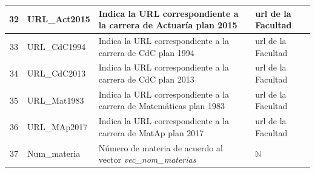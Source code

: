 {\begin{longtable}{|c|l|p{7cm}|p{2.6cm}|}
\hline 
32 & URL\_Act2015 & Indica la URL correspondiente a la carrera de Actuaría plan 2015 & url de la Facultad \\ 
\hline 
33 & URL\_CdC1994 & Indica la URL correspondiente a la carrera de CdC plan 1994 & url de la Facultad \\ 
\hline 
34 & URL\_CdC2013 & Indica la URL correspondiente a la carrera de CdC plan 2013 & url de la Facultad \\ 
\hline 
35 & URL\_Mat1983 & Indica la URL correspondiente a la carrera de Matemáticas plan 1983 & url de la Facultad \\ 
\hline 
36 & URL\_MAp2017 & Indica la URL correspondiente a la carrera de MatAp plan 2017 & url de la Facultad \\ 
\hline 
37 & Num\_materia & Número de materia de acuerdo al vector \textit{vec\_nom\_materias} & $\mathbb{N}$ \\ 
\hline 
\end{longtable}}







\renewcommand\lstlistingname{Código} %
\renewcommand\lstlistlistingname{Códigos} %

